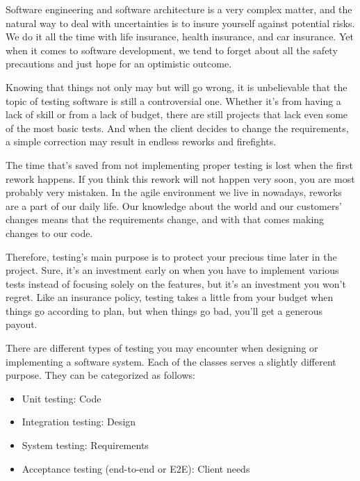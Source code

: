 
Software engineering and software architecture is a very complex matter, and the natural way to deal with uncertainties is to insure yourself against potential risks. We do it all the time with life insurance, health insurance, and car insurance. Yet when it comes to software development, we tend to forget about all the safety precautions and just hope for an optimistic outcome.

Knowing that things not only may but will go wrong, it is unbelievable that the topic of testing software is still a controversial one. Whether it's from having a lack of skill or from a lack of budget, there are still projects that lack even some of the most basic tests. And when the client decides to change the requirements, a simple correction may result in endless reworks and firefights.

The time that's saved from not implementing proper testing is lost when the first rework happens. If you think this rework will not happen very soon, you are most probably very mistaken. In the agile environment we live in nowadays, reworks are a part of our daily life. Our knowledge about the world and our customers' changes means that the requirements change, and with that comes making changes to our code.

Therefore, testing's main purpose is to protect your precious time later in the project. Sure, it's an investment early on when you have to implement various tests instead of focusing solely on the features, but it's an investment you won't regret. Like an insurance policy, testing takes a little from your budget when things go according to plan, but when things go bad, you'll get a generous payout.



There are different types of testing you may encounter when designing or implementing a software system. Each of the classes serves a slightly different purpose. They can be categorized as follows:

\begin{itemize}
\item 
Unit testing: Code

\item 
Integration testing: Design

\item 
System testing: Requirements

\item 
Acceptance testing (end-to-end or E2E): Client needs
\end{itemize}

